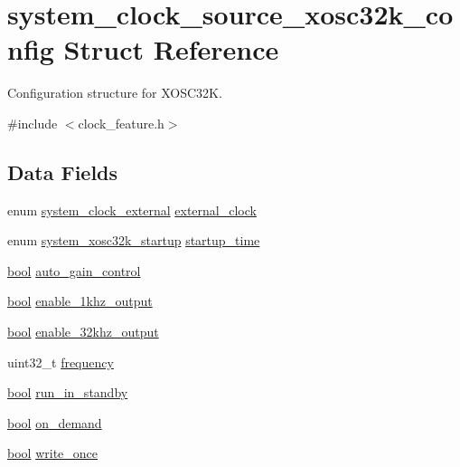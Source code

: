 \hypertarget{structsystem__clock__source__xosc32k__config}{}\section{system\+\_\+clock\+\_\+source\+\_\+xosc32k\+\_\+config Struct Reference}
\label{structsystem__clock__source__xosc32k__config}


Configuration structure for X\+O\+S\+C32K.  




{\ttfamily \#include $<$clock\+\_\+feature.\+h$>$}

\subsection*{Data Fields}
\begin{DoxyCompactItemize}
\item 
enum \mbox{\hyperlink{group__asfdoc__sam0__system__clock__group_gab463f9d80799466f12321e6252493e70}{system\+\_\+clock\+\_\+external}} \mbox{\hyperlink{structsystem__clock__source__xosc32k__config_aeced8f86ac9232f6fba8a4a13e5eae27}{external\+\_\+clock}}
\item 
enum \mbox{\hyperlink{group__asfdoc__sam0__system__clock__group_ga6a5226fe65f283da094a3d1bd6c5692f}{system\+\_\+xosc32k\+\_\+startup}} \mbox{\hyperlink{structsystem__clock__source__xosc32k__config_a57be16a01eb8dea465b7e1c94ba9ecd8}{startup\+\_\+time}}
\item 
\mbox{\hyperlink{group__group__sam0__utils_ga97a80ca1602ebf2303258971a2c938e2}{bool}} \mbox{\hyperlink{structsystem__clock__source__xosc32k__config_ad22a6285703ad7cd0a9febbc8d8ecde9}{auto\+\_\+gain\+\_\+control}}
\item 
\mbox{\hyperlink{group__group__sam0__utils_ga97a80ca1602ebf2303258971a2c938e2}{bool}} \mbox{\hyperlink{structsystem__clock__source__xosc32k__config_a1b19b8025cbbd0e1c0760a1fe845d084}{enable\+\_\+1khz\+\_\+output}}
\item 
\mbox{\hyperlink{group__group__sam0__utils_ga97a80ca1602ebf2303258971a2c938e2}{bool}} \mbox{\hyperlink{structsystem__clock__source__xosc32k__config_a904f4432fc52ffd6d0ec7ac0f4f8f461}{enable\+\_\+32khz\+\_\+output}}
\item 
uint32\+\_\+t \mbox{\hyperlink{structsystem__clock__source__xosc32k__config_ab632fb0b4d5156ea4df0b1e15410e913}{frequency}}
\item 
\mbox{\hyperlink{group__group__sam0__utils_ga97a80ca1602ebf2303258971a2c938e2}{bool}} \mbox{\hyperlink{structsystem__clock__source__xosc32k__config_a514964d5c2a8da4dd96bac82a53477f2}{run\+\_\+in\+\_\+standby}}
\item 
\mbox{\hyperlink{group__group__sam0__utils_ga97a80ca1602ebf2303258971a2c938e2}{bool}} \mbox{\hyperlink{structsystem__clock__source__xosc32k__config_a23620c12634b9230d2325ec5c245cf32}{on\+\_\+demand}}
\item 
\mbox{\hyperlink{group__group__sam0__utils_ga97a80ca1602ebf2303258971a2c938e2}{bool}} \mbox{\hyperlink{structsystem__clock__source__xosc32k__config_a9caf694235ca3f471e8167a317b6f581}{write\+\_\+once}}
\end{DoxyCompactItemize}


